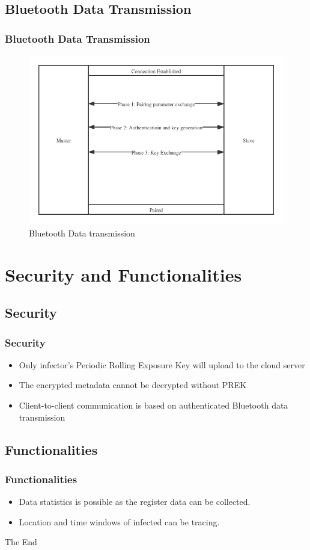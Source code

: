 \documentclass{beamer}
\begin{document}
\subsection{Bluetooth Data Transmission}
\begin{frame}
  \frametitle{Bluetooth Data Transmission}
  \begin{figure}[]
    \centering
    \includegraphics[height=0.6\textwidth]{figure/auble}
    \caption{Bluetooth Data transmission}
  \end{figure}
  

\end{frame}

\section{Security and Functionalities}
\subsection{Security}
\begin{frame}
  \frametitle{Security}
  \begin{itemize}
    \item Only infector’s Periodic Rolling Exposure Key will upload to the cloud server
    \item The encrypted metadata cannot be decrypted without PREK
    \item Client-to-client communication is based on authenticated Bluetooth data transmission
  \end{itemize}

\end{frame}

\subsection{Functionalities}
\begin{frame}
  \frametitle{Functionalities}
  \begin{itemize}
    \item Data statistics is possible as the register data can be collected.
    \item Location and time windows of infected can be tracing.
  \end{itemize}

\end{frame}


\begin{frame}
\Huge{\centerline{The End}}
\end{frame}

\end{document}
